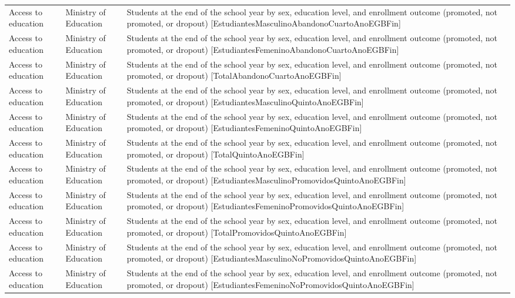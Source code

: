 \documentclass[10pt,a4paper]{article}
\begin{document}
\begin{longtable}{@{}>{\raggedright\arraybackslash}p{3.5cm}>{\raggedright\arraybackslash}p{5.6cm}>{\raggedright\arraybackslash}p{\dimexpr\textwidth-9.1cm-4\tabcolsep\relax}@{}}
Access to education & Ministry of Education & Students at the end of the school year by sex, education level, and enrollment outcome (promoted, not promoted, or dropout) [EstudiantesMasculinoAbandonoCuartoAnoEGBFin]\\
Access to education & Ministry of Education & Students at the end of the school year by sex, education level, and enrollment outcome (promoted, not promoted, or dropout) [EstudiantesFemeninoAbandonoCuartoAnoEGBFin]\\
Access to education & Ministry of Education & Students at the end of the school year by sex, education level, and enrollment outcome (promoted, not promoted, or dropout) [TotalAbandonoCuartoAnoEGBFin]\\
Access to education & Ministry of Education & Students at the end of the school year by sex, education level, and enrollment outcome (promoted, not promoted, or dropout) [EstudiantesMasculinoQuintoAnoEGBFin]\\
Access to education & Ministry of Education & Students at the end of the school year by sex, education level, and enrollment outcome (promoted, not promoted, or dropout) [EstudiantesFemeninoQuintoAnoEGBFin]\\
Access to education & Ministry of Education & Students at the end of the school year by sex, education level, and enrollment outcome (promoted, not promoted, or dropout) [TotalQuintoAnoEGBFin]\\
Access to education & Ministry of Education & Students at the end of the school year by sex, education level, and enrollment outcome (promoted, not promoted, or dropout) [EstudiantesMasculinoPromovidosQuintoAnoEGBFin]\\
Access to education & Ministry of Education & Students at the end of the school year by sex, education level, and enrollment outcome (promoted, not promoted, or dropout) [EstudiantesFemeninoPromovidosQuintoAnoEGBFin]\\
Access to education & Ministry of Education & Students at the end of the school year by sex, education level, and enrollment outcome (promoted, not promoted, or dropout) [TotalPromovidosQuintoAnoEGBFin]\\
Access to education & Ministry of Education & Students at the end of the school year by sex, education level, and enrollment outcome (promoted, not promoted, or dropout) [EstudiantesMasculinoNoPromovidosQuintoAnoEGBFin]\\
Access to education & Ministry of Education & Students at the end of the school year by sex, education level, and enrollment outcome (promoted, not promoted, or dropout) [EstudiantesFemeninoNoPromovidosQuintoAnoEGBFin]\\

\end{longtable}
\end{document}
